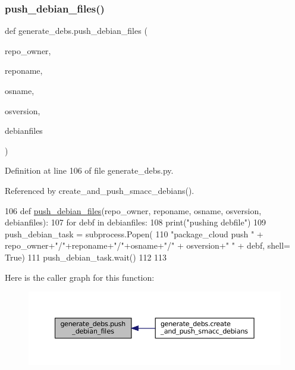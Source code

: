 \subsubsection{\texorpdfstring{push\+\_\+debian\+\_\+files()}{push\_debian\_files()}}
{\footnotesize\ttfamily def generate\+\_\+debs.\+push\+\_\+debian\+\_\+files (\begin{DoxyParamCaption}\item[{}]{repo\+\_\+owner,  }\item[{}]{reponame,  }\item[{}]{osname,  }\item[{}]{osversion,  }\item[{}]{debianfiles }\end{DoxyParamCaption})}



Definition at line 106 of file generate\+\_\+debs.\+py.



Referenced by create\+\_\+and\+\_\+push\+\_\+smacc\+\_\+debians().


\begin{DoxyCode}
106 \textcolor{keyword}{def }\hyperlink{namespacegenerate__debs_a9b22f5ad65b40b7903c467eda308e575}{push\_debian\_files}(repo\_owner, reponame,  osname, osversion, debianfiles):
107     \textcolor{keywordflow}{for} debf \textcolor{keywordflow}{in} debianfiles:
108         print(\textcolor{stringliteral}{"pushing debfile"})
109         push\_debian\_task = subprocess.Popen(
110             \textcolor{stringliteral}{"package\_cloud push "} + repo\_owner+\textcolor{stringliteral}{"/"}+reponame+\textcolor{stringliteral}{"/"}+osname+\textcolor{stringliteral}{"/"} + osversion+\textcolor{stringliteral}{" "} + debf, shell=\textcolor{keyword}{
      True})
111         push\_debian\_task.wait()
112 
113 
\end{DoxyCode}
Here is the caller graph for this function\+:
\nopagebreak
\begin{figure}[H]
\begin{center}
\leavevmode
\includegraphics[width=350pt]{namespacegenerate__debs_a9b22f5ad65b40b7903c467eda308e575_icgraph}
\end{center}
\end{figure}
\mbox{\label{namespacegenerate__debs_a08095040d038b3613ad0e77fd4e7f60e}} 
